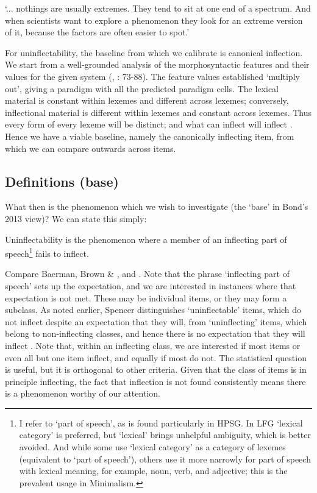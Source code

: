 \documentclass[output=paper]{langscibook}
\begin{document}
‘... nothings are usually extremes. They tend to sit at one end of a spectrum. And when scientists want to explore a phenomenon they look for an extreme version of it, because the factors are often easier to spot.’   \citet[2]{Webb2013}

For uninflectability, the baseline from which we calibrate is canonical inflection. We start from a well-grounded analysis of the morphosyntactic features and their values for the given system (\citealt{Zaliznjak1973}, \citealt{Corbett2012}: 73-88). The feature values established ‘multiply out’, giving a paradigm with all the predicted paradigm cells. The lexical material is constant within lexemes and different across lexemes; conversely, inflectional material is different within lexemes and constant across lexemes. Thus every form of every lexeme will be distinct; and what can inflect will inflect \citep[150-151]{Corbett2015}. Hence we have a viable baseline, namely the canonically inflecting item, from which we can compare outwards across items.

\subsection{\textbf{Definitions} \textbf{(base)}}

What then is the phenomenon which we wish to investigate (the ‘base’ in Bond’s 2013 view)? We can state this simply: 

Uninflectability is the phenomenon where a member of an inflecting part of speech\footnote{I refer to ‘part of speech’, as is found particularly in HPSG. In LFG ‘lexical category’ is preferred, but ‘lexical’ brings unhelpful ambiguity, which is better avoided. And while some use ‘lexical category’ as a category of lexemes (equivalent to ‘part of speech’), others use it more narrowly for part of speech with lexical meaning, for example, noun, verb, and adjective; this is the prevalent usage in Minimalism.} fails to inflect. 

Compare Baerman, Brown \& \citet[27-35]{Corbett2005}, and \citet[142-143]{Spencer2020}. Note that the phrase ‘inflecting part of speech’ sets up the expectation, and we are interested in instances where that expectation is not met. These may be individual items, or they may form a subclass. As noted earlier, Spencer distinguishes ‘uninflectable’ items, which do not inflect despite an expectation that they will, from ‘uninflecting’ items, which belong to non\nobreakdash-inflecting classes, and hence there is no expectation that they will inflect \citep[142]{Spencer2020}. Note that, within an inflecting class, we are interested if most items or even all but one item inflect, and equally if most do not. The statistical question is useful, but it is orthogonal to other criteria. Given that the class of items is in principle inflecting, the fact that inflection is not found consistently means there is a phenomenon worthy of our attention. 
\end{document}
